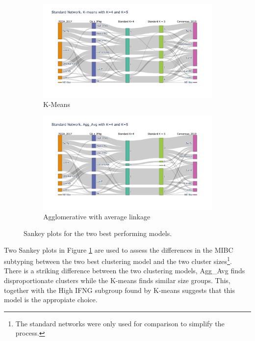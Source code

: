 \begin{figure}[!htb]
    \hfill
    \begin{subfigure}[b]{0.49\textwidth}
        \centering
        \includegraphics[width=\textwidth,keepaspectratio]{Sections/Network_I/Resources/P0/Sankey_KM_4K.png}
        \caption{K-Means}
    \end{subfigure}
    \hfill
    \begin{subfigure}[b]{0.49\textwidth}
        \centering
        \includegraphics[width=\textwidth,keepaspectratio]{Sections/Network_I/Resources/P0/Sankey_Avg_4K.png}
        \caption{Agglomerative with average linkage}
    \end{subfigure}
    \hfill
    \caption{Sankey plots for the two best performing models. }
    \label{fig:N_I:p0_sky_Agg_KMeans}
\end{figure}


Two Sankey plots in Figure \ref{fig:N_I:p0_sky_Agg_KMeans} are used to assess the differences in the MIBC subtyping between the two best clustering model and the two cluster sizes\footnote{The standard networks were only used for comparison to simplify the process.}. There is a striking difference between the two clustering models, Agg\_Avg finds disproportionate clusters while the K-means finds similar size groups. This, together with the High IFNG subgroup found by K-means suggests that this model is the appropiate choice. 


